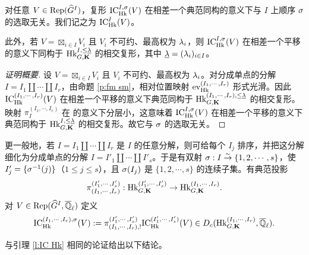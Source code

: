 \begin{lem}\label{l:IC Hk}
对任意 $V\in \textup{Rep}(\widehat{G}^{I})$，复形 $\textup{IC}^{I,\sigma}_{\textup{Hk}}(V)$ 在相差一个典范同构的意义下与 $I$ 上顺序 $\sigma$ 的选取无关。我们记之为 $\textup{IC}^{I}_{\textup{Hk}}(V)$。

此外，若 $V=\boxtimes_{i\in I}V_{i}$ 且 $V_{i}$ 不可约、最高权为 $\lambda_{i}$，则 $\textup{IC}^{I,\sigma}_{\textup{Hk}}(V)$ 在相差一个平移的意义下同构于 $\textup{Hk}^{I, \le\underline{\lambda}}_{G,\mathbf{K}}$ 的相交复形，其中 $\underline{\lambda}=(\lambda_{i})_{i\in I}$。
\end{lem}
\begin{proof}[证明概要] 设 $V=\boxtimes_{i\in I}V_{i}$ 且 $V_{i}$ 不可约、最高权为 $\lambda_{i}$。对分成单点的分解 $I=I_{1}\coprod\cdots\coprod I_{r}$，由命题 \ref{p:fm sm}，相对位置映射 $\textup{ev}^{(I_{1},\cdots, I_{r})}_{\textup{Hk}}$ 形式光滑。因此 $\textup{IC}^{(I_{1},\cdots, I_{r})}_{\textup{Hk}}(V)$ 在相差一个平移的意义下典范同构于 $\textup{Hk}^{(I_{1},\cdots, I_{r}), \le\underline{\lambda}}_{G,\mathbf{K}}$ 的相交复形。映射 $\pi^{(I_{1},\cdots, I_{r})}_{I}$ 在 \cite[命题 4.2 之后]{MV} 的意义下分层小，这意味着 $\textup{IC}^{I,\sigma}_{\textup{Hk}}(V)$ 在相差一个平移的意义下典范同构于 $\textup{Hk}^{I, \le\underline{\lambda}}_{G,\mathbf{K}}$ 的相交复形。故它与 $\sigma$ 的选取无关。
\end{proof}

更一般地，若 $I=I_{1}\coprod\cdots \coprod I_{r}$ 是 $I$ 的任意分解，则可给每个 $I_{j}$ 排序，并把这分解细化为分成单点的分解 $I=I'_{1}\coprod\cdots \coprod I'_{s}$。于是有双射 $\sigma: I\stackrel{\sim}{\to} \{1,2,\cdots, s\}$，使 $I'_{j}=\{\sigma^{-1}(j)\}$（$1\le j\le s$），且 $\sigma(I_{j})$ 是 $\{1,2,\cdots, s\}$ 的连续子集。有典范投影
\begin{equation*}
\pi^{(I'_{1},\cdots, I'_{s})}_{(I_{1},\cdots, I_{r})}: \textup{Hk}^{(I'_{1},\cdots, I'_{s})}_{G,\mathbf{K}}\to \textup{Hk}^{(I_{1},\cdots, I_{r})}_{G,\mathbf{K}}.
\end{equation*}
对 $V\in \textup{Rep}(\widehat{G}^{I}, \overline{\mathbb{Q}}_\ell)$ 定义
\begin{equation*}
\textup{IC}^{(I_{1},\cdots, I_{r}),\sigma}_{\textup{Hk}}(V):=\pi^{(I'_{1},\cdots, I'_{s})}_{(I_{1},\cdots, I_{r}), !}\textup{IC}^{(I'_{1},\cdots, I'_{s})}_{\textup{Hk}}(V)\in D_{c}(\textup{Hk}^{(I_{1},\cdots, I_{r})}_{G,\mathbf{K}}, \overline{\mathbb{Q}}_\ell).
\end{equation*}

与引理 \ref{l:IC Hk} 相同的论证给出以下结论。

